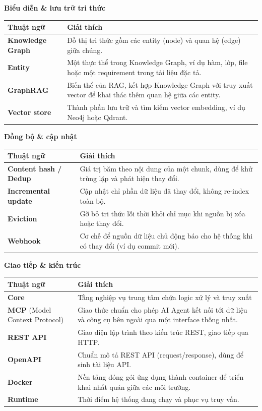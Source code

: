 \textbf{Biểu diễn \& lưu trữ tri thức}

\begin{table}[H]
\centering
\begin{tabular}{p{3cm}p{12cm}}
\toprule
Thuật ngữ & Giải thích \\
\midrule
\textbf{Knowledge Graph} & Đồ thị tri thức gồm các entity (node) và quan hệ (edge) giữa chúng. \\
\textbf{Entity} & Một thực thể trong Knowledge Graph, ví dụ hàm, lớp, file hoặc một requirement trong tài liệu đặc tả. \\
\textbf{GraphRAG} & Biến thể của RAG, kết hợp Knowledge Graph với truy xuất vector để khai thác thêm quan hệ giữa các entity. \\
\textbf{Vector store} & Thành phần lưu trữ và tìm kiếm vector embedding, ví dụ Neo4j hoặc Qdrant. \\
\bottomrule
\end{tabular}
\end{table}

\textbf{Đồng bộ \& cập nhật}

\begin{table}[H]
\centering
\begin{tabular}{p{2.5cm}p{12.6cm}}
\toprule
Thuật ngữ & Giải thích \\
\midrule
\textbf{Content hash / Dedup} & Giá trị băm theo nội dung của một chunk, dùng để khử trùng lặp và phát hiện thay đổi. \\
\textbf{Incremental update} & Cập nhật chỉ phần dữ liệu đã thay đổi, không re-index toàn bộ. \\
\textbf{Eviction} & Gỡ bỏ tri thức lỗi thời khỏi chỉ mục khi nguồn bị xóa hoặc thay đổi. \\
\textbf{Webhook} & Cơ chế để nguồn dữ liệu chủ động báo cho hệ thống khi có thay đổi (ví dụ commit mới). \\
\bottomrule
\end{tabular}
\end{table}

\textbf{Giao tiếp \& kiến trúc}

\begin{table}[H]
\centering
\begin{tabular}{p{3cm}p{12cm}}
\toprule
Thuật ngữ & Giải thích \\
\midrule
\textbf{Core} & Tầng nghiệp vụ trung tâm chứa logic xử lý và truy xuất \\
\textbf{MCP} (Model Context Protocol) & Giao thức chuẩn cho phép AI Agent kết nối tới dữ liệu và công cụ bên ngoài qua một interface thống nhất. \\
\textbf{REST API} & Giao diện lập trình theo kiến trúc REST, giao tiếp qua HTTP. \\
\textbf{OpenAPI} & Chuẩn mô tả REST API (request/response), dùng để sinh tài liệu API. \\
\textbf{Docker} & Nền tảng đóng gói ứng dụng thành container để triển khai nhất quán giữa các môi trường. \\
\textbf{Runtime} & Thời điểm hệ thống đang chạy và phục vụ truy vấn. \\
\bottomrule
\end{tabular}
\end{table}

